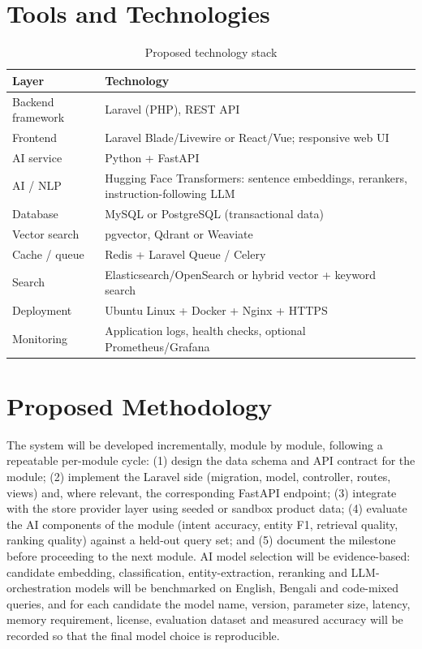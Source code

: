 \documentclass[12pt,a4paper]{article}
\begin{document}
\section{Tools and Technologies}

\begin{table}[H]
\centering
\caption{Proposed technology stack}
\begin{tabular}{ll}
\toprule
\textbf{Layer} & \textbf{Technology} \\
\midrule
Backend framework & Laravel (PHP), REST API \\
Frontend & Laravel Blade/Livewire or React/Vue; responsive web UI \\
AI service & Python + FastAPI \\
AI / NLP & Hugging Face Transformers: sentence embeddings, rerankers, instruction-following LLM \\
Database & MySQL or PostgreSQL (transactional data) \\
Vector search & pgvector, Qdrant or Weaviate \\
Cache / queue & Redis + Laravel Queue / Celery \\
Search & Elasticsearch/OpenSearch or hybrid vector + keyword search \\
Deployment & Ubuntu Linux + Docker + Nginx + HTTPS \\
Monitoring & Application logs, health checks, optional Prometheus/Grafana \\
\bottomrule
\end{tabular}
\end{table}

\section{Proposed Methodology}

The system will be developed incrementally, module by module, following a repeatable per-module cycle: (1) design
the data schema and API contract for the module; (2) implement the Laravel side (migration, model, controller,
routes, views) and, where relevant, the corresponding FastAPI endpoint; (3) integrate with the store provider
layer using seeded or sandbox product data; (4) evaluate the AI components of the module (intent accuracy, entity
F1, retrieval quality, ranking quality) against a held-out query set; and (5) document the milestone before
proceeding to the next module. AI model selection will be evidence-based: candidate embedding, classification,
entity-extraction, reranking and LLM-orchestration models will be benchmarked on English, Bengali and code-mixed
queries, and for each candidate the model name, version, parameter size, latency, memory requirement, license,
evaluation dataset and measured accuracy will be recorded so that the final model choice is reproducible.
\end{document}

